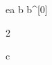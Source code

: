 \begin{eqcode}{e}{a }{}{}
  b \in {} \lend
  b^{[0]} \gets \begin{tmatrix} 2  \lend \end{tmatrix} \lend
  c \gets {} \lend 
   \lend 
\end{eqcode}
